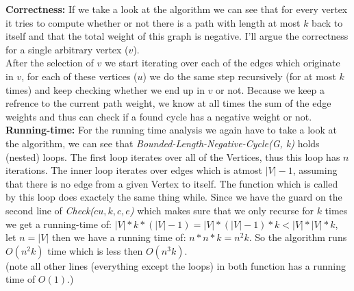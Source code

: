 \documentclass{article}
\begin{document}
\textbf{Correctness:}
If we take a look at the algorithm we can see that for every vertex it tries to compute whether or not there is a path with length at most $k$ back to itself and that the total weight of this graph is negative. I'll argue the correctness for a single arbitrary vertex ($v$).\\

After the selection of $v$ we start iterating over each of the edges which originate in $v$, for each of these vertices ($u$) we do the same step recursively (for at most $k$ times) and keep checking whether we end up in $v$ or not. Because we keep a refrence to the current path weight, we know at all times the sum of the edge weights and thus can check if a found cycle has a negative weight or not. \\


\textbf{Running-time:}
For the running time analysis we again have to take a look at the algorithm, we can see that \emph{Bounded-Length-Negative-Cycle(G, k)} holds (nested) loops. The first loop iterates over all of the Vertices, thus this loop has $n$ iterations. The inner loop iterates over edges which is atmost $|V|-1$, assuming that there is no edge from a given Vertex to itself. The function which is called by this loop does exactely the same thing while. Since we have the guard on the second line of \emph{Check($cu,k,c,e$)} which makes sure that we only recurse for $k$ times we get a running-time of:
$|V| * k * (|V|-1)=|V|*(|V|-1)*k<|V|*|V|*k$, let $n=|V|$ then we have a running time of: $n*n*k=n^2k$. So the algorithm runs  $O(n^2k)$ time which is less then $O(n^3k)$. \\

(note all other lines (everything except the loops) in both function has a running time of $O(1)$.)
\end{document}
